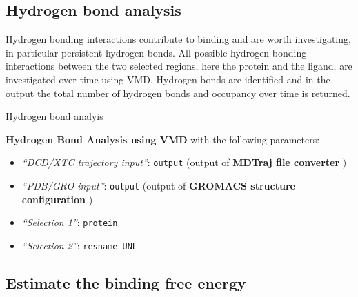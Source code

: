 \documentclass[twocolumn]{bmcart}%
\providecommand{\tightlist}{%
  \setlength{\itemsep}{0pt}\setlength{\parskip}{0pt}}
\begin{document}
\hypertarget{hydrogen-bond-analysis}{%
\subsection*{Hydrogen bond analysis}\label{hydrogen-bond-analysis}}

Hydrogen bonding interactions contribute to binding and are worth investigating, in particular persistent hydrogen bonds. All possible hydrogen bonding interactions between the two selected regions, here the protein and the ligand, are investigated over time using VMD. Hydrogen bonds are identified and in the output the total number of hydrogen bonds and  occupancy over time is returned.

\begin{handson_box_colour}{Hydrogen bond analyis}

  \textbf{Hydrogen Bond Analysis using VMD} with the following
  parameters:

  \begin{itemize}
  \tightlist
  \item
    \emph{``DCD/XTC trajectory input''}: \texttt{output} (output of
    \textbf{MDTraj file converter} )
  \item
    \emph{``PDB/GRO input''}: \texttt{output} (output of \textbf{GROMACS
    structure configuration} )
  \item
    \emph{``Selection 1''}: \texttt{protein}
  \item
    \emph{``Selection 2''}: \texttt{resname\ UNL}
  \end{itemize}



\end{handson_box_colour}


\hypertarget{optional-estimate-the-binding-free-energy}{%
\subsection*{Estimate the binding free
energy}\label{optional-estimate-the-binding-free-energy}}
\end{document}
